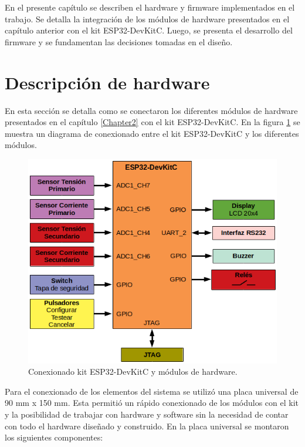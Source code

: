 
En el presente capítulo se describen el hardware y firmware implementados en el trabajo. Se detalla la integración de los módulos de hardware presentados en el capítulo anterior con el kit ESP32-DevKitC. Luego, se presenta el desarrollo del firmware y se fundamentan las decisiones tomadas en el diseño.

\section{Descripción de hardware}
En esta sección se detalla como se conectaron los diferentes módulos de hardware presentados en el capítulo \ref{Chapter2} con el kit ESP32-DevKitC. En la figura \ref{fig:conexionado} se muestra un diagrama de conexionado entre el kit ESP32-DevKitC y los diferentes módulos.

\begin{figure}[htpb]
	\centering
	\includegraphics[scale=0.7]{./Figures/diagrama_det.png}
	\caption{Conexionado kit ESP32-DevKitC y módulos de hardware.}
	\label{fig:conexionado}
\end{figure}

Para el conexionado de los elementos del sistema se utilizó una placa universal de 90 mm x 150 mm. Esta permitió un rápido conexionado de los módulos con el kit y la posibilidad de trabajar con hardware y software sin la necesidad de contar con todo el hardware diseñado y construido. En la placa universal se montaron los siguientes componentes:

